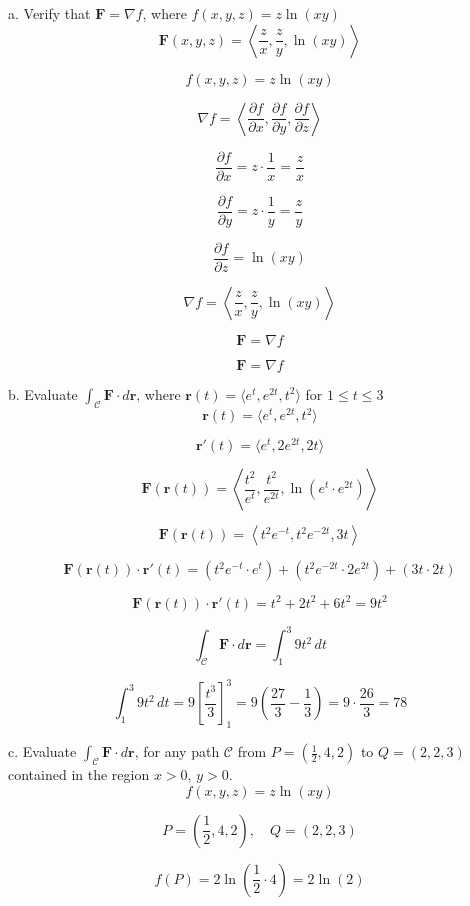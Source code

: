 \documentclass[hidelinks]{article}
\begin{document}
a. Verify that $\mathbf{F} = \nabla f$, where $f(x,y,z) = z \ln(xy)$
\[
\mathbf{F}(x,y,z) = \left\langle \frac{z}{x}, \frac{z}{y}, \ln(xy) \right\rangle
\]

\[
f(x,y,z) = z \ln(xy)
\]

\[
\nabla f = \left\langle \frac{\partial f}{\partial x}, \frac{\partial f}{\partial y}, \frac{\partial f}{\partial z} \right\rangle
\]

\[
\frac{\partial f}{\partial x} = z \cdot \frac{1}{x} = \frac{z}{x}
\]

\[
\frac{\partial f}{\partial y} = z \cdot \frac{1}{y} = \frac{z}{y}
\]

\[
\frac{\partial f}{\partial z} = \ln(xy)
\]

\[
\nabla f = \left\langle \frac{z}{x}, \frac{z}{y}, \ln(xy) \right\rangle
\]

\[
\mathbf{F} = \nabla f
\]

\[
    \mathbf{F} = \nabla f
\]

b. Evaluate $\int_\mathcal{C} \mathbf{F} \cdot d\mathbf{r}$, where $\mathbf{r}(t) = \langle e^t, e^{2t}, t^2\rangle$ for $1 \leq t \leq 3$
\[
\mathbf{r}(t) = \langle e^t, e^{2t}, t^2 \rangle
\]

\[
\mathbf{r}'(t) = \langle e^t, 2e^{2t}, 2t \rangle
\]

\[
\mathbf{F}(\mathbf{r}(t)) = \left\langle \frac{t^2}{e^t}, \frac{t^2}{e^{2t}}, \ln(e^t \cdot e^{2t}) \right\rangle
\]

\[
\mathbf{F}(\mathbf{r}(t)) = \left\langle t^2 e^{-t}, t^2 e^{-2t}, 3t \right\rangle
\]

\[
\mathbf{F}(\mathbf{r}(t)) \cdot \mathbf{r}'(t) = (t^2 e^{-t} \cdot e^t) + (t^2 e^{-2t} \cdot 2e^{2t}) + (3t \cdot 2t)
\]

\[
\mathbf{F}(\mathbf{r}(t)) \cdot \mathbf{r}'(t) = t^2 + 2t^2 + 6t^2 = 9t^2
\]

\[
\int_\mathcal{C} \mathbf{F} \cdot d\mathbf{r} = \int_{1}^{3} 9t^2 \, dt
\]

\[
\int_{1}^{3} 9t^2 \, dt = 9 \left[ \frac{t^3}{3} \right]_{1}^{3} = 9 \left( \frac{27}{3} - \frac{1}{3} \right) = 9 \cdot \frac{26}{3} = 78
\]

\newpage
c. Evaluate $\int_\mathcal{C} \mathbf{F} \cdot d\mathbf{r}$, for any path $\mathcal{C}$ from $P = (\frac{1}{2}, 4, 2)$ to $Q = (2, 2,3)$ contained in the region $x>0$, $y>0$. 
\[
f(x, y, z) = z \ln(xy)
\]

\[
P = \left(\frac{1}{2}, 4, 2\right), \quad Q = (2, 2, 3)
\]

\[
f(P) = 2 \ln\left(\frac{1}{2} \cdot 4\right) = 2 \ln(2)
\]
\end{document}
